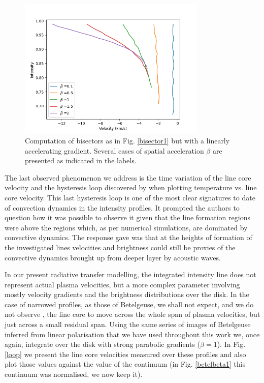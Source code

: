 \documentclass{/Users/art2/TeX/aanda/aa}
\begin{document}
\begin{figure}
   \includegraphics[width=0.8\textwidth]{Bisectors_accel.png}
   \caption{Computation of bisectors as in Fig. \ref{bisector1} but with a linearly accelerating gradient. Several cases of  spatial acceleration $\beta$ 
   are presented as indicated in the labels.}
   \label{bisector2}
   \end{figure}

The last observed phenomenon we address is the time variation of the line core velocity and the hysteresis loop discovered by 
\cite{kravchenko_tomography_2019} when plotting temperature vs. line core velocity. This last hysteresis loop is one of the most clear signatures 
to date of convection dynamics in the intensity profiles. It prompted the authors to question how it was possible to observe it given that the 
line formation regions were above the regions which, as per numerical simulations, are dominated by convective dynamics. The response 
\cite{kravchenko_tomography_2019}  gave was that at the heights of formation of the investigated lines velocities and brightness could still be 
proxies of the convective dynamics brought up from deeper layer by acoustic waves. 

In our present radiative transfer modelling, the integrated intensity line does not represent actual plasma velocities, but a more complex parameter 
involving mostly velocity gradients and the brightness distributions over the disk. In the case of narrowed profiles, as those of Betelgeuse, we shall 
not expect, and we do not observe , the line core to move across the whole span of plasma velocities, but just across a small residual span. Using the 
same series of images of Betelgeuse inferred from linear polarisation that we have used throughout this work \citep{auriere_discovery_2016} we, once 
again, integrate over the disk with strong parabolic gradients ($\beta=1$). In Fig. \ref{loop} we present the line core velocities measured over these 
profiles and also plot those values against the value of the continuum (in Fig. \ref{betelbeta1} this continuum was normalised, we now keep it).
\end{document}
